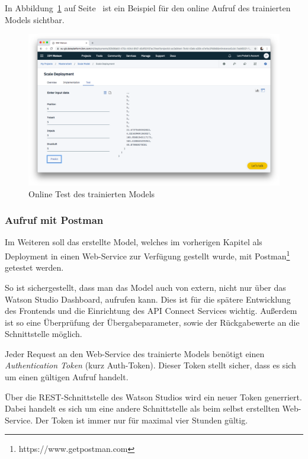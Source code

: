 In Abbildung~\ref{fig:umsetzung_deployment_test} auf Seite~\pageref{fig:umsetzung_deployment_test} ist ein Beispiel für
den online Aufruf des trainierten Models sichtbar.

\begin{figure}[h]
    \centering
    \includegraphics[width=\textwidth]{images/kapitel_3/deployment_test.png}
    \caption{Online Test des trainierten Models}
    \label{fig:umsetzung_deployment_test}
\end{figure}

\subsubsection{Aufruf mit Postman}
\label{subsec:Aufruf mit Postman}
Im Weiteren soll das erstellte Model, welches im vorherigen Kapitel als Deployment in einen Web-Service zur Verfügung
gestellt wurde, mit Postman\footnote{https://www.getpostman.com} getestet werden.

So ist sichergestellt, dass man das Model auch von extern, nicht nur über das Watson Studio Dashboard, aufrufen kann.
Dies ist für die spätere Entwicklung des Frontends und die Einrichtung des API Connect Services wichtig. Außerdem ist
so eine Überprüfung der Übergabeparameter, sowie der Rückgabewerte an die Schnittstelle möglich.

Jeder Request an den Web-Service des trainierte Models benötigt einen \textit{Authentication Token} (kurz Auth-Token).
Dieser Token stellt sicher, dass es sich um einen gültigen Aufruf handelt.

Über die REST-Schnittstelle des Watson Studios wird ein neuer Token generriert. Dabei handelt es sich um eine andere
Schnittstelle als beim selbst erstellten Web-Service. Der Token ist immer nur für maximal vier Stunden gültig.

